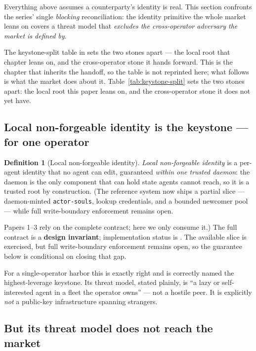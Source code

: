\documentclass[11pt,a4paper]{article}
\theoremstyle{definition}
\newtheorem{definition}{Definition}[section]
\theoremstyle{definition}
\theoremstyle{remark}
\begin{document}
Everything above assumes a counterparty's identity is real. This section confronts
the series' single \emph{blocking} reconciliation: the identity primitive the
whole market leans on covers a threat model that \emph{excludes the cross-operator
adversary the market is defined by}.

\ifpdbook
The keystone-split table in  sets the two stones
apart --- the local root that chapter leans on, and the cross-operator stone it
hands forward. This is the chapter that inherits the handoff, so the table is
not reprinted here; what follows is what the market does about it.
\else
Table~\ref{tab:keystone-split} sets the two stones apart: the local root this
paper leans on, and the cross-operator stone it does not yet have.


\fi

\subsection{Local non-forgeable identity is the keystone --- for one operator}

\begin{definition}[Local non-forgeable identity]\label{def:local-id}
\setlength{\parskip}{4pt plus 1pt}
\emph{Local non-forgeable identity} is a per-agent identity that no agent can edit,
guaranteed \emph{within one trusted daemon}: the daemon is the only component that
can hold state agents cannot reach, so it is a trusted root by construction. (The
reference system now ships a partial slice --- daemon-minted \texttt{actor-souls}, lookup
credentials, and a bounded newcomer pool --- while full write-boundary
enforcement remains open. 

Papers 1--3 rely on the complete contract; here we only
consume it.) The full contract is a \textbf{design invariant}; implementation
status is \BuiltWeak{}. The available slice is exercised, but full
write-boundary enforcement remains open, so the guarantee below is conditional
on closing that gap.
\end{definition}

For a single-operator harbor this is exactly right and is correctly named the
highest-leverage keystone. Its threat model, stated plainly, is ``a lazy or
self-interested agent in a fleet the operator owns'' --- not a hostile peer. It is
explicitly \emph{not} a public-key infrastructure spanning strangers.

\subsection{But its threat model does not reach the market}\label{sec:0040b}
\end{document}

